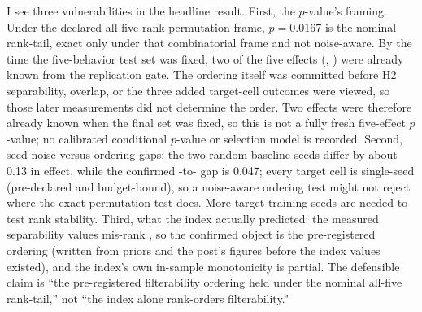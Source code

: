 I see three vulnerabilities in the headline result. First, the $p$-value's
framing. Under the declared
all-five rank-permutation frame, $p = 0.0167$ is the nominal rank-tail, exact
only under that combinatorial frame and not noise-aware. By the time the
five-behavior test set was fixed, two of the five effects
(, ) were already known from the
replication gate. The ordering itself was committed before H2 separability,
overlap, or the three added target-cell outcomes were viewed, so those later
measurements did not determine the order. Two effects were therefore already
known when the final set was fixed, so this is not a fully fresh five-effect
$p$-value; no calibrated conditional $p$-value or selection model is
recorded. Second, seed noise versus ordering gaps: the two random-baseline
seeds differ by about 0.13 in  effect, while the
confirmed -to- gap is
0.047; every target cell is single-seed (pre-declared and budget-bound), so a
noise-aware ordering test might not reject where the exact permutation test
does. More target-training seeds are needed to test rank stability. Third,
what the index actually predicted: the measured separability values
mis-rank , so the confirmed object is the
pre-registered ordering (written from priors and the post's figures
before the index values existed), and the index's own in-sample
monotonicity is partial. The defensible claim is ``the pre-registered
filterability ordering held under the nominal all-five rank-tail,'' not
``the index alone rank-orders filterability.''
